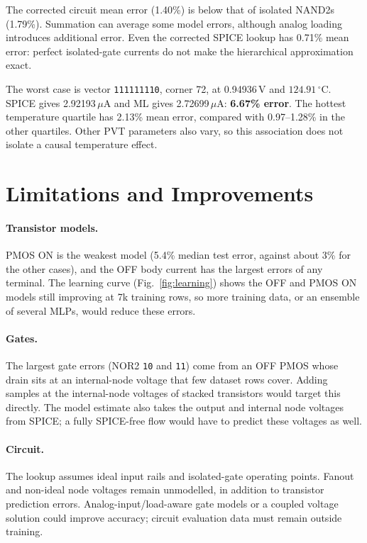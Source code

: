 \documentclass[11pt]{article}
\begin{document}
The corrected circuit mean error (1.40\%) is below that of isolated NAND2s
(1.79\%). Summation can average some model errors, although analog loading
introduces additional error. Even the corrected SPICE lookup has 0.71\%
mean error: perfect isolated-gate currents do not make the hierarchical
approximation exact.

The worst case is vector \texttt{111111110}, corner 72, at 0.94936\,V and
$124.91\,^\circ$C. SPICE gives 2.92193\,$\mu$A and ML gives
2.72699\,$\mu$A: \textbf{6.67\% error}. The hottest temperature quartile
has 2.13\% mean error, compared with 0.97--1.28\% in the other quartiles.
Other PVT parameters also vary, so this association does not isolate a
causal temperature effect.

\section{Limitations and Improvements}
\label{sec:limits}

\paragraph{Transistor models.}
PMOS ON is the weakest model (5.4\% median test error, against about 3\% for
the other cases), and the OFF body current has the largest errors of any
terminal. The learning curve (Fig.~\ref{fig:learning}) shows the OFF and PMOS
ON models still improving at 7k training rows, so more training data, or an
ensemble of several MLPs, would reduce these errors.

\paragraph{Gates.}
The largest gate errors (NOR2 \texttt{10} and \texttt{11}) come from an OFF
PMOS whose drain sits at an internal-node voltage that few dataset rows
cover. Adding samples at the internal-node voltages of stacked transistors
would target this directly. The model estimate also takes the output and
internal node voltages from SPICE; a fully SPICE-free flow would have to
predict these voltages as well.

\paragraph{Circuit.}
The lookup assumes ideal input rails and isolated-gate operating points.
Fanout and non-ideal node voltages remain unmodelled, in addition to
transistor prediction errors. Analog-input/load-aware gate models or a
coupled voltage solution could improve accuracy; circuit evaluation data
must remain outside training.
\end{document}
